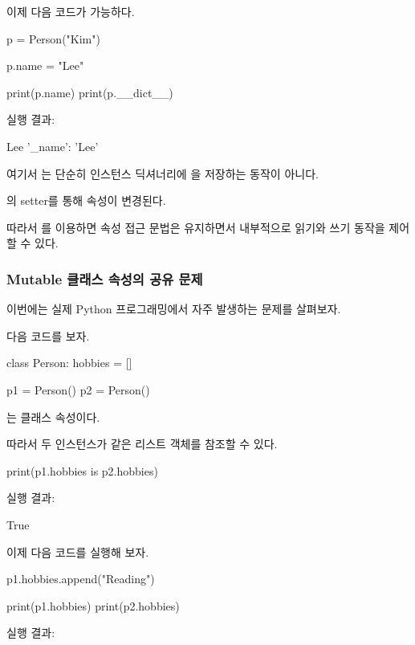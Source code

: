 이제 다음 코드가 가능하다.

\begin{dhkcode}
p = Person("Kim")

p.name = "Lee"

print(p.name)
print(p.__dict__)
\end{dhkcode}

실행 결과:

\begin{dhkzsh}
Lee
{'_name': 'Lee'}
\end{dhkzsh}

여기서 는 단순히 인스턴스 딕셔너리에 을 저장하는 동작이 아니다.

의 setter를 통해  속성이 변경된다.

따라서 를 이용하면 속성 접근 문법은 유지하면서 내부적으로 읽기와 쓰기 동작을 제어할 수 있다.

\subsubsection{Mutable 클래스 속성의 공유 문제}

이번에는 실제 Python 프로그래밍에서 자주 발생하는 문제를 살펴보자.

다음 코드를 보자.

\begin{dhkcode}
class Person:
    hobbies = []


p1 = Person()
p2 = Person()
\end{dhkcode}

는 클래스 속성이다.

따라서 두 인스턴스가 같은 리스트 객체를 참조할 수 있다.

\begin{dhkcode}
print(p1.hobbies is p2.hobbies)
\end{dhkcode}

실행 결과:

\begin{dhkzsh}
True
\end{dhkzsh}

이제 다음 코드를 실행해 보자.

\begin{dhkcode}
p1.hobbies.append("Reading")

print(p1.hobbies)
print(p2.hobbies)
\end{dhkcode}

실행 결과:

\begin{dhkzsh}
['Reading']
['Reading']
\end{dhkzsh}

